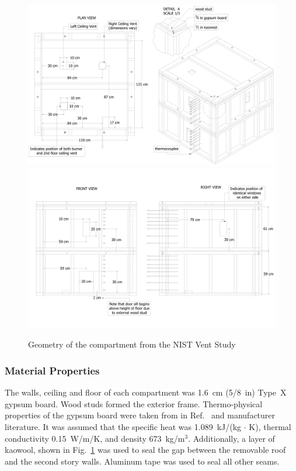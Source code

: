 \begin{figure}[p]
\includegraphics[width=\textwidth]{FIGURES/NIST_Vent_Study/Latex_Plan_View}
\includegraphics[width=\textwidth]{FIGURES/NIST_Vent_Study/Latex_Front_TC}
\caption[Geometry of the compartment from the NIST Vent Study]{Geometry of the compartment from the NIST Vent Study}
\label{NIST_Vent_Study_Drawing}
\end{figure}

\subsubsection{Material Properties}

The walls, ceiling and floor of each compartment was 1.6~cm (5/8~in) Type~X gypsum board. Wood studs formed the exterior frame. Thermo-physical properties of the gypsum board were taken from in Ref.~\cite{Manzello:SiF08} and manufacturer literature. It was assumed that the specific heat was 1.089~kJ/(kg $\cdot$ K), thermal conductivity 0.15~W/m/K, and density 673~kg/m$^3$.  Additionally, a  layer of kaowool, shown in Fig.~\ref{NIST_Vent_Study_Drawing} was used to seal the gap between the removable roof and the second story walls. Aluminum tape was used to seal all other seams.

